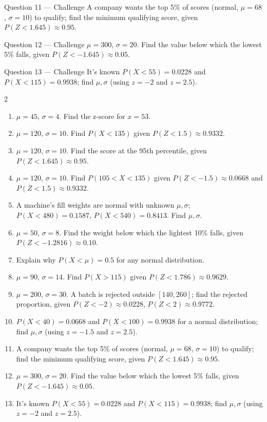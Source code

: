 \documentclass[11pt]{article}
\begin{document}
\begin{qbox}{Question 11 --- Challenge}
A company wants the top 5\% of scores (normal, $\mu=68$, $\sigma=10$) to qualify; find the minimum qualifying score, given $P(Z<1.645)\approx0.95$.\workspace{3.2cm}
\end{qbox}

\begin{qbox}{Question 12 --- Challenge}
$\mu=300$, $\sigma=20$. Find the value below which the lowest 5\% falls, given $P(Z<-1.645)\approx0.05$.\workspace{3cm}
\end{qbox}

\begin{qbox}{Question 13 --- Challenge}
It's known $P(X<55)=0.0228$ and $P(X<115)=0.9938$; find $\mu,\sigma$ (using $z=-2$ and $z=2.5$).\workspace{3.2cm}
\end{qbox}

\clearpage
{}

\begin{recapbox}
\begin{multicols}{2}
\small
\begin{enumerate}[leftmargin=*,itemsep=3pt]
  \item $\mu=45$, $\sigma=4$. Find the z-score for $x=53$.
  \item $\mu=120$, $\sigma=10$. Find $P(X<135)$ given $P(Z<1.5)\approx0.9332$.
  \item $\mu=120$, $\sigma=10$. Find the score at the 95th percentile, given $P(Z<1.645)\approx0.95$.
  \item $\mu=120$, $\sigma=10$. Find $P(105<X<135)$ given $P(Z<-1.5)\approx0.0668$ and $P(Z<1.5)\approx0.9332$.
  \item A machine's fill weights are normal with unknown $\mu,\sigma$; $P(X<480)=0.1587$, $P(X<540)=0.8413$. Find $\mu,\sigma$.
  \item $\mu=50$, $\sigma=8$. Find the weight below which the lightest 10\% falls, given $P(Z<-1.2816)\approx0.10$.
  \item Explain why $P(X<\mu)=0.5$ for any normal distribution.
  \item $\mu=90$, $\sigma=14$. Find $P(X>115)$ given $P(Z<1.786)\approx0.9629$.
  \item $\mu=200$, $\sigma=30$. A batch is rejected outside $[140,260]$; find the rejected proportion, given $P(Z<-2)\approx0.0228$, $P(Z<2)\approx0.9772$.
  \item $P(X<40)=0.0668$ and $P(X<100)=0.9938$ for a normal distribution; find $\mu,\sigma$ (using $z=-1.5$ and $z=2.5$).
  \item A company wants the top 5\% of scores (normal, $\mu=68$, $\sigma=10$) to qualify; find the minimum qualifying score, given $P(Z<1.645)\approx0.95$.
  \item $\mu=300$, $\sigma=20$. Find the value below which the lowest 5\% falls, given $P(Z<-1.645)\approx0.05$.
  \item It's known $P(X<55)=0.0228$ and $P(X<115)=0.9938$; find $\mu,\sigma$ (using $z=-2$ and $z=2.5$).
\end{enumerate}
\end{multicols}
\end{recapbox}
\end{document}
